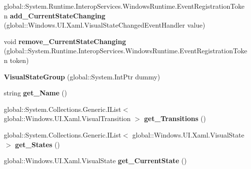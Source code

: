 \begin{DoxyCompactItemize}
\item 
\mbox{\label{class_windows_1_1_u_i_1_1_xaml_1_1_visual_state_group_a5fad6e8105f727dac7ab1a1b62568c0a}} 
global\+::\+System.\+Runtime.\+Interop\+Services.\+Windows\+Runtime.\+Event\+Registration\+Token {\bfseries add\+\_\+\+Current\+State\+Changing} (global\+::\+Windows.\+U\+I.\+Xaml.\+Visual\+State\+Changed\+Event\+Handler value)
\item 
\mbox{\label{class_windows_1_1_u_i_1_1_xaml_1_1_visual_state_group_aa287d3d7b305f3adad8090ce145b7729}} 
void {\bfseries remove\+\_\+\+Current\+State\+Changing} (global\+::\+System.\+Runtime.\+Interop\+Services.\+Windows\+Runtime.\+Event\+Registration\+Token token)
\item 
\mbox{\label{class_windows_1_1_u_i_1_1_xaml_1_1_visual_state_group_a8f7185159b1235d9b31261ec34a8498c}} 
{\bfseries Visual\+State\+Group} (global\+::\+System.\+Int\+Ptr dummy)
\item 
\mbox{\label{class_windows_1_1_u_i_1_1_xaml_1_1_visual_state_group_a2813cd015a01c964c6588672b185ac26}} 
string {\bfseries get\+\_\+\+Name} ()
\item 
\mbox{\label{class_windows_1_1_u_i_1_1_xaml_1_1_visual_state_group_a3738f82b20d960a14fdcfb568b232d49}} 
global\+::\+System.\+Collections.\+Generic.\+I\+List$<$ global\+::\+Windows.\+U\+I.\+Xaml.\+Visual\+Transition $>$ {\bfseries get\+\_\+\+Transitions} ()
\item 
\mbox{\label{class_windows_1_1_u_i_1_1_xaml_1_1_visual_state_group_a5f5c4abd2e95e2f7522780c26a7db8fd}} 
global\+::\+System.\+Collections.\+Generic.\+I\+List$<$ global\+::\+Windows.\+U\+I.\+Xaml.\+Visual\+State $>$ {\bfseries get\+\_\+\+States} ()
\item 
\mbox{\label{class_windows_1_1_u_i_1_1_xaml_1_1_visual_state_group_a74be4bea547bdf72e792a3c489cb7878}} 
global\+::\+Windows.\+U\+I.\+Xaml.\+Visual\+State {\bfseries get\+\_\+\+Current\+State} ()

\end{DoxyCompactItemize}
